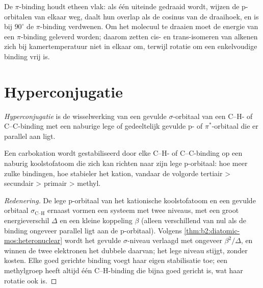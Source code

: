 De $\pi$-binding houdt etheen vlak: als één uiteinde gedraaid wordt, wijzen de p-orbitalen
van elkaar weg, daalt hun overlap als de cosinus van de draaihoek, en is bij $90^\circ$
de $\pi$-binding verdwenen. Om het molecuul te draaien moet de energie van een $\pi$-binding geleverd worden;
daarom zetten cis- en trans-isomeren van alkenen zich bij
kamertemperatuur niet in elkaar om, terwijl rotatie om een enkelvoudige binding vrij is.

\section{Hyperconjugatie}

\begin{definition}[Hyperconjugatie]\label{def:b2:fragment-orbitals:hyperconjugation}
\emph{Hyperconjugatie} is de wisselwerking van een gevulde
$\sigma$-orbitaal van een C--H- of C--C-binding met een naburige lege of gedeeltelijk gevulde
p- of $\pi^*$-orbitaal die er parallel aan ligt.
\end{definition}

\begin{proposition}\label{prop:b2:fragment-orbitals:hyperconjugation}
Een carbokation wordt gestabiliseerd door elke C--H- of C--C-binding op een naburig koolstofatoom die
zich kan richten naar zijn lege p-orbitaal: hoe meer zulke bindingen, hoe stabieler het
kation, vandaar de volgorde tertiair > secundair > primair > methyl.
\end{proposition}

\begin{proof}[Redenering]
De lege p-orbitaal van het kationische koolstofatoom en een gevulde orbitaal $\sigma_{\text{C--H}}$
ernaast vormen een systeem met twee niveaus, met een groot energieverschil $\Delta$ en een kleine koppeling
$\beta$ (alleen verschillend van nul als de binding ongeveer parallel ligt aan de p-orbitaal). Volgens
\cref{thm:b2:diatomic-mos:heteronuclear} wordt het gevulde $\sigma$-niveau verlaagd met ongeveer
$\beta^2/\Delta$, en winnen de twee elektronen het dubbele daarvan; het lege niveau stijgt, zonder
kosten. Elke goed gerichte binding voegt haar eigen stabilisatie toe; een methylgroep
heeft altijd één C--H-binding die bijna goed gericht is, wat haar rotatie ook is.
\end{proof}

